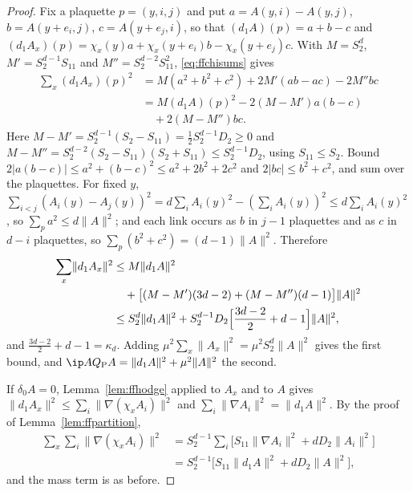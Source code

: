 \begin{proof}
Fix a plaquette $p=(y,i,j)$ and put $a=A(y,i)-A(y,j)$, $b=A(y+e_i,j)$,
$c=A(y+e_j,i)$, so that $(d_1A)(p)=a+b-c$ and $(d_1A_x)(p)=\chi_x(y)a+\chi_x
(y+e_i)b-\chi_x(y+e_j)c$. With $M=S_2^d$, $M'=S_2^{d-1}S_{11}$ and $M''=
S_2^{d-2}S_{11}^2$, \eqref{eq:ffchisums} gives
\begin{align*}
\sum_x(d_1A_x)(p)^2&=M(a^2+b^2+c^2)+2M'(ab-ac)-2M''bc\\
&=M(d_1A)(p)^2-2(M-M')a(b-c)\\
&\quad+2(M-M'')bc.
\end{align*}
Here $M-M'=S_2^{d-1}(S_2-S_{11})=\frac12S_2^{d-1}D_2\ge0$ and $M-M''=S_2^{d-2}
(S_2-S_{11})(S_2+S_{11})\le S_2^{d-1}D_2$, using $S_{11}\le S_2$. Bound
$2\lvert a(b-c)\rvert\le a^2+(b-c)^2\le a^2+2b^2+2c^2$ and $2\lvert bc\rvert
\le b^2+c^2$, and sum over the plaquettes. For fixed $y$, $\sum_{i<j}(A_i(y)
-A_j(y))^2=d\sum_iA_i(y)^2-(\sum_iA_i(y))^2\le d\sum_iA_i(y)^2$, so $\sum_p
a^2\le d\lVert A\rVert^2$; and each link occurs as $b$ in $j-1$ plaquettes
and as $c$ in $d-i$ plaquettes, so $\sum_p(b^2+c^2)=(d-1)\lVert A\rVert^2$.
Therefore
\begin{align*}
\sum_x\lVert d_1A_x\rVert^2&\le M\lVert d_1A\rVert^2\\
&\quad+\bigl[(M-M')(3d-2)+(M-M'')(d-1)\bigr]\lVert A\rVert^2\\
&\le S_2^d\lVert d_1A\rVert^2+S_2^{d-1}D_2\Bigl[\frac{3d-2}2+d-1\Bigr]
\lVert A\rVert^2,
\end{align*}
and $\frac{3d-2}2+d-1=\kappa_d$. Adding $\mu^2\sum_x\lVert A_x\rVert^2=\mu^2
S_2^d\lVert A\rVert^2$ gives the first bound, and $\ip A{Q_{\rm P}A}=\lVert
d_1A\rVert^2+\mu^2\lVert A\rVert^2$ the second.

If $\delta_0A=0$, Lemma~\ref{lem:ffhodge} applied to $A_x$ and to $A$ gives
$\lVert d_1A_x\rVert^2\le\sum_i\lVert\nabla(\chi_xA_i)\rVert^2$ and $\sum_i
\lVert\nabla A_i\rVert^2=\lVert d_1A\rVert^2$. By the proof of
Lemma~\ref{lem:ffpartition},
\begin{align*}
\sum_x\sum_i\lVert\nabla(\chi_xA_i)\rVert^2
&=S_2^{d-1}\sum_i\bigl[S_{11}\lVert\nabla A_i\rVert^2+dD_2\lVert A_i\rVert^2\bigr]\\
&=S_2^{d-1}\bigl[S_{11}\lVert d_1A\rVert^2+dD_2\lVert A\rVert^2\bigr],
\end{align*}
and the mass term is as before.
\end{proof}


